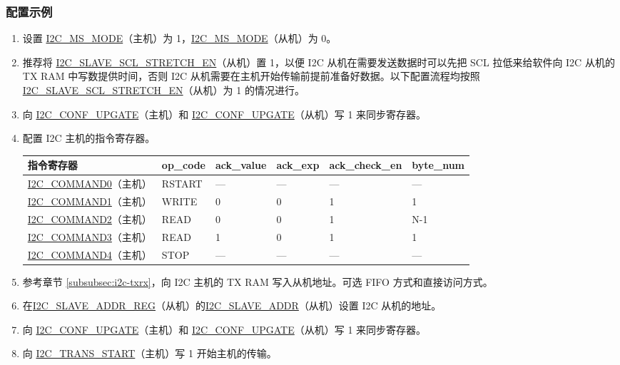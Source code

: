 \documentclass[main\_\_CN.tex]{subfiles}
\begin{document}
\subsubsection{配置示例}
\begin{enumerate}
\item 设置 \hyperref[fielddesc:I2CMSMODE]{I2C\_MS\_MODE}（主机）为 1，\hyperref[fielddesc:I2CMSMODE]{I2C\_MS\_MODE}（从机）为 0。
\item 推荐将 \hyperref[fielddesc:I2CSLAVESCLSTRETCHEN]{I2C\_SLAVE\_SCL\_STRETCH\_EN}（从机）置 1，以便 I2C 从机在需要发送数据时可以先把 SCL 拉低来给软件向 I2C 从机的 TX RAM 中写数提供时间，否则 I2C 从机需要在主机开始传输前提前准备好数据。以下配置流程均按照\hyperref[fielddesc:I2CSLAVESCLSTRETCHEN]{I2C\_SLAVE\_SCL\_STRETCH\_EN}（从机）为 1 的情况进行。
\item 向 \hyperref[fielddesc:I2CCONFUPGATE]{I2C\_CONF\_UPGATE}（主机）和 \hyperref[fielddesc:I2CCONFUPGATE]{I2C\_CONF\_UPGATE}（从机）写 1 来同步寄存器。
\item 配置 I2C 主机的指令寄存器。
\begin{longtable}{ | p{4cm} | p{2cm} | p{2cm} | p{2cm} |p{2cm} | p{2cm} |}
\hline\rowcolor{lightgray}
指令寄存器& op\_code & ack\_value&ack\_exp&ack\_check\_en&byte\_num  \\ \hline
\hyperref[fielddesc:I2CCOMMAND0]{I2C\_COMMAND0}（主机）& RSTART& ---&---&---&---  \\ \hline
\hyperref[fielddesc:I2CCOMMAND1]{I2C\_COMMAND1}（主机）& WRITE& 0&0&1&1  \\ \hline
\hyperref[fielddesc:I2CCOMMAND2]{I2C\_COMMAND2}（主机）& READ& 0&0&1&N-1  \\ \hline
\hyperref[fielddesc:I2CCOMMAND3]{I2C\_COMMAND3}（主机）& READ& 1&0&1&1  \\ \hline
\hyperref[fielddesc:I2CCOMMAND4]{I2C\_COMMAND4}（主机）& STOP& ---&---&---&---  \\ \hline
\end{longtable}
\item 参考章节 \ref{subsubsec:i2c-txrx}，向 I2C 主机的 TX RAM 写入从机地址。可选 FIFO 方式和直接访问方式。
\item 在\hyperref[regdesc:I2CSLAVEADDRREG]{I2C\_SLAVE\_ADDR\_REG}（从机）的\hyperref[fielddesc:I2CSLAVEADDR]{I2C\_SLAVE\_ADDR}（从机）设置 I2C 从机的地址。
\item 向 \hyperref[fielddesc:I2CCONFUPGATE]{I2C\_CONF\_UPGATE}（主机）和 \hyperref[fielddesc:I2CCONFUPGATE]{I2C\_CONF\_UPGATE}（从机）写 1 来同步寄存器。
\item 向 \hyperref[fielddesc:I2CTRANSSTART]{I2C\_TRANS\_START}（主机）写 1 开始主机的传输。

\end{enumerate}
\end{document}
